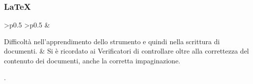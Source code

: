 \subsubsection{\LaTeX}
\renewcommand{\arraystretch}{1.5}
\begin{longtable}{ 
    >{}p{} 
        >{}p{}
}
\rowcolorhead
\centering {} &

\centering {} 
\endfirsthead	
\endhead
Difficoltà nell'apprendimento dello strumento e quindi nella scrittura di documenti. & Si è ricordato ai Verificatori di controllare oltre alla correttezza del contenuto dei documenti, anche la corretta impaginazione. \\
\caption{Tabella problemi \LaTeX}
    \end{longtable}.
